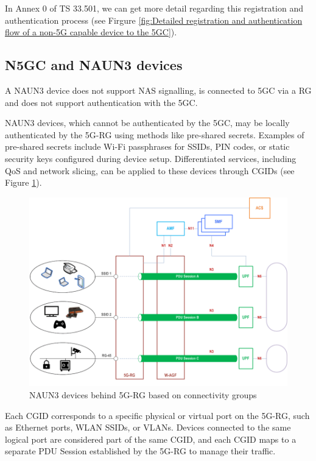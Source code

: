 In Annex 0 of TS 33.501, we can get more detail regarding this registration and authentication process (see Firgure \ref{fig:Detailed registration and authentication flow of a non-5G capable device to the 5GC}).

\subsection{\ac{N5GC} and \ac{NAUN3} devices}

A \ac{NAUN3} device does not support \ac{NAS} signalling, is connected to \ac{5GC} via a \ac{RG} and does not support authentication with the \ac{5GC}.%

\ac{NAUN3} devices, which cannot be authenticated by the \ac{5GC}, may be locally authenticated by the \ac{5G-RG} using methods like pre-shared secrets. Examples of pre-shared secrets include Wi-Fi passphrases for \acp{SSID}, \ac{PIN} codes, or static security keys configured during device setup. Differentiated services, including \ac{QoS} and network slicing, can be applied to these devices through \ac{CGIDs} (see Figure \ref{fig:NAUN3 devices behind 5G-RG based on connectivity groups}).

\begin{figure}
    \centering
    \includegraphics[width=0.75\linewidth]{figs/NAUN3 devices behind 5G-RG based on connectivity groups.png}
    \caption{NAUN3 devices behind \ac{5G-RG} based on connectivity groups}
    \label{fig:NAUN3 devices behind 5G-RG based on connectivity groups}
\end{figure}

Each \ac{CGID} corresponds to a specific physical or virtual port on the \ac{5G-RG}, such as Ethernet ports, \ac{WLAN} \acp{SSID}, or \acp{VLAN}. Devices connected to the same logical port are considered part of the same \ac{CGID}, and each \ac{CGID} maps to a separate \ac{PDU} Session established by the \ac{5G-RG} to manage their traffic.

